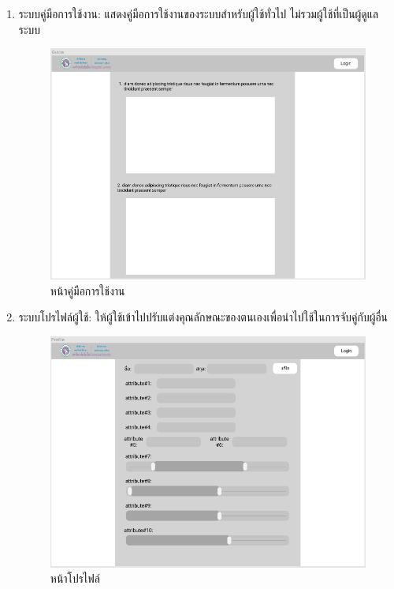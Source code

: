 \begin{enumerate}
  \clearpage
  \item ระบบคู่มือการใช้งาน: แสดงคู่มือการใช้งานของระบบสำหรับผู้ใช้ทั่วไป ไม่รวมผู้ใช้ที่เป็นผู้ดูแลระบบ
  \begin{figure}[h]
  \begin{center}
  \includegraphics[width=\linewidth]{photo/Guideline.png}
  \end{center}
  \caption{หน้าคู่มือการใช้งาน}
  \label{fig:guideline}
  \end{figure}

  \clearpage
  \item ระบบโปรไฟล์ผู้ใช้: ให้ผู้ใช้เข้าไปปรับแต่งคุณลักษณะของตนเองเพื่อนำไปใช้ในการจับคู่กับผู้อื่น
  \begin{figure}[h]
  \begin{center}
  \includegraphics[width=\linewidth]{photo/profile.png}
  \end{center}
  \caption{หน้าโปรไฟล์}
  \label{fig:profile}
  \end{figure}
  
\end{enumerate}


